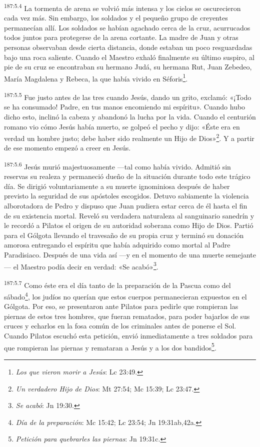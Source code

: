\par 
\textsuperscript{187:5.4} La tormenta de arena se volvió más intensa y los cielos se oscurecieron cada vez más. Sin embargo, los soldados y el pequeño grupo de creyentes permanecían allí. Los soldados se habían agachado cerca de la cruz, acurrucados todos juntos para protegerse de la arena cortante. La madre de Juan y otras personas observaban desde cierta distancia, donde estaban un poco resguardadas bajo una roca saliente. Cuando el Maestro exhaló finalmente su último suspiro, al pie de su cruz se encontraban su hermano Judá, su hermana Rut, Juan Zebedeo, María Magdalena y Rebeca, la que había vivido en Séforis\footnote{\textit{Los que vieron morir a Jesús}: Lc 23:49.}.

\par 
\textsuperscript{187:5.5} Fue justo antes de las tres cuando Jesús, dando un grito, exclamó: «¡Todo se ha consumado! Padre, en tus manos encomiendo mi espíritu». Cuando hubo dicho esto, inclinó la cabeza y abandonó la lucha por la vida. Cuando el centurión romano vio cómo Jesús había muerto, se golpeó el pecho y dijo: «Éste era en verdad un hombre justo; debe haber sido realmente un Hijo de Dios»\footnote{\textit{Un verdadero Hijo de Dios}: Mt 27:54; Mc 15:39; Lc 23:47.}. Y a partir de ese momento empezó a creer en Jesús.

\par 
\textsuperscript{187:5.6} Jesús murió majestuosamente ---tal como había vivido. Admitió sin reservas su realeza y permaneció dueño de la situación durante todo este trágico día. Se dirigió voluntariamente a su muerte ignominiosa después de haber previsto la seguridad de sus apóstoles escogidos. Detuvo sabiamente la violencia alborotadora de Pedro y dispuso que Juan pudiera estar cerca de él hasta el fin de su existencia mortal. Reveló su verdadera naturaleza al sanguinario sanedrín y le recordó a Pilatos el origen de su autoridad soberana como Hijo de Dios. Partió para el Gólgota llevando el travesaño de su propia cruz y terminó su donación amorosa entregando el espíritu que había adquirido como mortal al Padre Paradisiaco. Después de una vida así ---y en el momento de una muerte semejante--- el Maestro podía decir en verdad: «Se acabó»\footnote{\textit{Se acabó}: Jn 19:30.}.

\par 
\textsuperscript{187:5.7} Como éste era el día tanto de la preparación de la Pascua como del sábado\footnote{\textit{Día de la preparación}: Mc 15:42; Lc 23:54; Jn 19:31ab,42a.}, los judíos no querían que estos cuerpos permanecieran expuestos en el Gólgota. Por eso, se presentaron ante Pilatos para pedirle que rompieran las piernas de estos tres hombres, que fueran rematados, para poder bajarlos de sus cruces y echarlos en la fosa común de los criminales antes de ponerse el Sol. Cuando Pilatos escuchó esta petición, envió inmediatamente a tres soldados para que rompieran las piernas y remataran a Jesús y a los dos bandidos\footnote{\textit{Petición para quebrarles las piernas}: Jn 19:31c.}.

